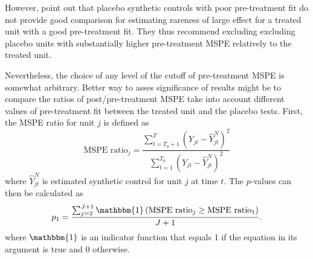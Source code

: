 
However, \citet{abadie_synthetic_2010}  point out that placebo synthetic controls with poor pre-treatment fit do not provide good comparison for estimating rareness of large effect for a treated unit with a good  pre-treatment fit. They thus recommend excluding excluding placebo units with substantially higher pre-treatment MSPE relatively to the treated unit. 

Nevertheless, the choice of any level of the cutoff of pre-treatment MSPE is somewhat arbitrary. Better way to asses significance of results might be to compare the ratios of post/pre-treatment MSPE
take into account different values of pre-treatment fit between the treated unit and the placebo tests. First, the  MSPE ratio for unit $j$ is defined as
\begin{equation} \label{eq:mspe_ratio}
\text{MSPE ratio}_j = \frac{\sum_{t = T_0 + 1}^{T} \left( Y_{jt} -  \hat Y_{jt}^N\right)^2}{\sum_{t = 1}^{T_0} \left( Y_{jt} -  \hat Y_{jt}^N\right)^2} 
\end{equation}
where $\hat Y_{jt}^N$ is estimated synthetic control for unit $j$ at time $t$. 
The  $p$-values can then be calculated as 
\begin{equation} \label{eq:p_ratio}
 p_1   = \frac{\sum_{j = 2}^{J + 1} \mathbbm{1}\left( \text{MSPE ratio}_{j} \geq \text{MSPE ratio}_{1} \right)}{J + 1}.
\end{equation}
where $\mathbbm{1}$ is an indicator function that equals 1 if the equation in its argument is true and 0 otherwise.  





